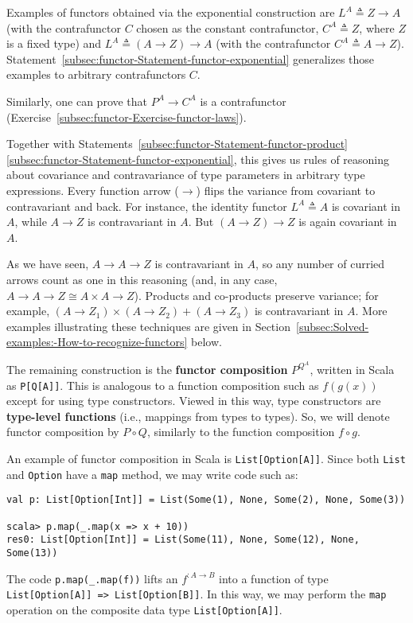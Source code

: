 Examples of functors obtained via the exponential
construction are $L^{A}\triangleq Z\rightarrow A$ (with the contrafunctor
$C$ chosen as the constant contrafunctor, $C^{A}\triangleq Z$, where
$Z$ is a fixed type) and $L^{A}\triangleq\left(A\rightarrow Z\right)\rightarrow A$
(with the contrafunctor $C^{A}\triangleq A\rightarrow Z$). Statement~\ref{subsec:functor-Statement-functor-exponential}
generalizes those examples to arbitrary contrafunctors $C$.

Similarly, one can prove that $P^{A}\rightarrow C^{A}$ is a contrafunctor
(Exercise~\ref{subsec:functor-Exercise-functor-laws}).

Together with Statements~\ref{subsec:functor-Statement-functor-product}\textendash \ref{subsec:functor-Statement-functor-exponential},
this gives us rules of reasoning about covariance and contravariance
of type parameters in arbitrary type expressions. Every function arrow
($\rightarrow$) flips the variance from covariant to contravariant
and back. For instance, the identity functor $L^{A}\triangleq A$
is covariant in $A$, while $A\rightarrow Z$ is contravariant in
$A$. But $\left(A\rightarrow Z\right)\rightarrow Z$ is again covariant
in $A$. 

As we have seen, $A\rightarrow A\rightarrow Z$ is contravariant in
$A$, so any number of curried arrows count as one in this reasoning
(and, in any case, $A\rightarrow A\rightarrow Z\cong A\times A\rightarrow Z$).
Products and co-products preserve variance; for example, $\left(A\rightarrow Z_{1}\right)\times\left(A\rightarrow Z_{2}\right)+\left(A\rightarrow Z_{3}\right)$
is contravariant in $A$. More examples illustrating these techniques
are given in Section~\ref{subsec:Solved-examples:-How-to-recognize-functors}
below.

The remaining construction is the \textbf{functor composition}
$P^{Q^{A}}$, written in Scala as \lstinline!P[Q[A]]!. This is analogous
to a function composition such as $f(g(x))$ except for using type
constructors. Viewed in this way, type constructors are \textbf{type-level
functions} (i.e., mappings from types
to types). So, we will denote functor composition by $P\circ Q$,
similarly to the function composition $f\circ g$.

An example of functor composition in Scala is \lstinline!List[Option[A]]!.
Since both \lstinline!List! and \lstinline!Option! have a \lstinline!map!
method, we may write code such as:
\begin{lstlisting}
val p: List[Option[Int]] = List(Some(1), None, Some(2), None, Some(3))

scala> p.map(_.map(x => x + 10))
res0: List[Option[Int]] = List(Some(11), None, Some(12), None, Some(13)) 
\end{lstlisting}
The code \lstinline!p.map(_.map(f))! lifts an $f^{:A\rightarrow B}$
into a function of type \lstinline!List[Option[A]] => List[Option[B]]!.
In this way, we may perform the \lstinline!map! operation on the
composite data type \lstinline!List[Option[A]]!. 

